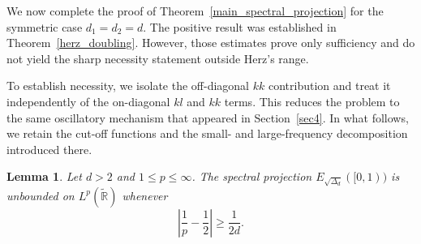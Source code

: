 \documentclass[12pt]{amsart}
\newcommand\R{\mathbb{R}}
\newtheorem{lemma}[theorem]{Lemma}
\begin{document}
We now complete the proof of Theorem~\ref{main_spectral_projection} for the
symmetric case \(d_1=d_2=d\). The positive result was established in
Theorem~\ref{herz_doubling}. However, those estimates prove only sufficiency
and do not yield the sharp necessity statement outside Herz's range.

To establish necessity, we isolate the off-diagonal \(kk\) contribution and
treat it independently of the on-diagonal \(kl\) and \(kk\) terms. This
reduces the problem to the same oscillatory mechanism that appeared in
Section~\ref{sec4}. In what follows, we retain the cut-off functions and the
small- and large-frequency decomposition introduced there.

\begin{lemma}\label{lem:negative:spectral}
Let \(d>2\) and \(1\le p\le\infty\). The spectral projection
\(E_{\sqrt{\Delta_d}}([0,1))\) is unbounded on \(L^p(\widetilde{\R})\) whenever
\[
    \left|\frac{1}{p}-\frac{1}{2}\right|
    \ge \frac{1}{2d}.
\]
\end{lemma}
\end{document}

